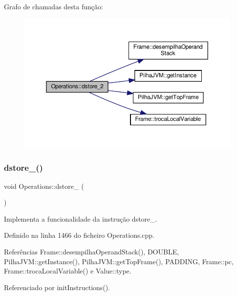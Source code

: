 Grafo de chamadas desta função\+:\nopagebreak
\begin{figure}[H]
\begin{center}
\leavevmode
\includegraphics[width=350pt]{classOperations_ad0f97963e6eb2482f5032fdb3465ec94_cgraph}
\end{center}
\end{figure}
\mbox{\label{classOperations_a161cba32105238617b0cfd5c47afdfe4}} 
\subsubsection{\texorpdfstring{dstore\+\_()}{dstore\_3()}}
{\footnotesize\ttfamily void Operations\+::dstore\+\_ (\begin{DoxyParamCaption}{ }\end{DoxyParamCaption})\hspace{0.3cm}{\ttfamily [private]}}



Implementa a funcionalidade da instrução dstore\+\_. 



Definido na linha 1466 do ficheiro Operations.\+cpp.



Referências Frame\+::desempilha\+Operand\+Stack(), D\+O\+U\+B\+LE, Pilha\+J\+V\+M\+::get\+Instance(), Pilha\+J\+V\+M\+::get\+Top\+Frame(), P\+A\+D\+D\+I\+NG, Frame\+::pc, Frame\+::troca\+Local\+Variable() e Value\+::type.



Referenciado por init\+Instructions().

